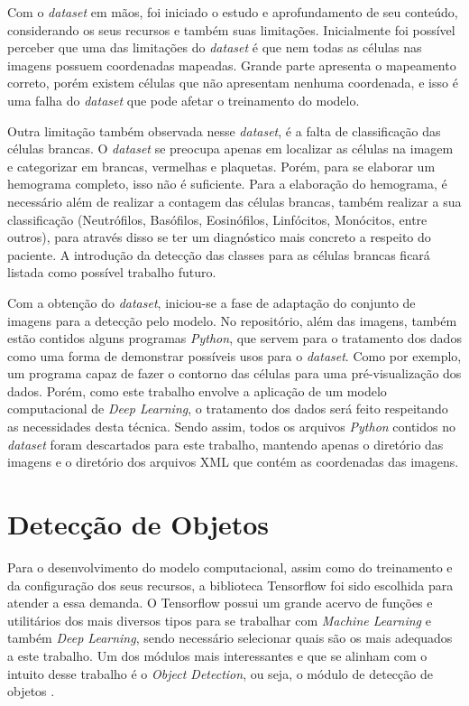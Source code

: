 Com o \emph{dataset} em mãos, foi iniciado o estudo e aprofundamento de seu conteúdo, considerando os seus recursos e também suas limitações. Inicialmente foi possível perceber que uma das limitações do \emph{dataset} é que nem todas as células nas imagens possuem coordenadas mapeadas. Grande parte apresenta o mapeamento correto, porém existem células que não apresentam nenhuma coordenada, e isso é uma falha do \emph{dataset} que pode afetar o treinamento do modelo.

Outra limitação também observada nesse \emph{dataset}, é a falta de classificação das células brancas. O \emph{dataset} se preocupa apenas em localizar as células na imagem e categorizar em brancas, vermelhas e plaquetas. Porém, para se elaborar um hemograma completo, isso não é suficiente. Para a elaboração do hemograma, é necessário além de realizar a contagem das células brancas, também realizar a sua classificação (Neutrófilos, Basófilos, Eosinófilos, Linfócitos, Monócitos, entre outros), para através disso se ter um diagnóstico mais concreto a respeito do paciente. A introdução da detecção das classes para as células brancas ficará listada como possível trabalho futuro.

Com a obtenção do \emph{dataset}, iniciou-se a fase de adaptação do conjunto de imagens para a detecção pelo modelo. No repositório, além das imagens, também estão contidos alguns programas \emph{Python}, que servem para o tratamento dos dados como uma forma de demonstrar possíveis usos para o \emph{dataset}. Como por exemplo, um programa capaz de fazer o contorno das células para uma pré-visualização dos dados. Porém, como este trabalho envolve a aplicação de um modelo computacional de \emph{Deep Learning}, o tratamento dos dados será feito respeitando as necessidades desta técnica. Sendo assim, todos os arquivos \emph{Python} contidos no \emph{dataset} foram descartados para este trabalho, mantendo apenas o diretório das imagens e o diretório dos arquivos XML que contém as coordenadas das imagens.

\section{Detecção de Objetos}
Para o desenvolvimento do modelo computacional, assim como do treinamento e da configuração dos seus recursos, a biblioteca Tensorflow foi sido escolhida para atender a essa demanda. O Tensorflow possui um grande acervo de funções e utilitários dos mais diversos tipos para se trabalhar com \emph{Machine Learning} e também \emph{Deep Learning}, sendo necessário selecionar quais são os mais adequados a este trabalho. Um dos módulos mais interessantes e que se alinham com o intuito desse trabalho é o \emph{Object Detection}, ou seja, o módulo de detecção de objetos \cite{websiteObjectDetection}.

